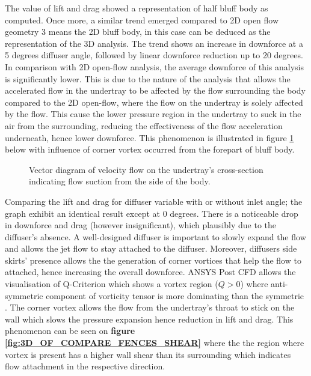 \noindent The value of lift and drag showed a representation of half bluff body as computed. Once more, a similar trend emerged compared to 2D open flow geometry 3 means the 2D bluff body, in this case can be deduced as the representation of the 3D analysis.  The trend shows an increase in downforce at a 5 degrees diffuser angle, followed by linear downforce reduction up to 20 degrees.  In comparison with 2D open-flow analysis, the average downforce of this analysis is significantly lower. This is due to the nature of the analysis that allows the accelerated flow in the undertray to be affected by the flow surrounding the body compared to the 2D open-flow, where the flow on the undertray is solely affected by the flow. This cause the lower pressure region in the undertray to suck in the air from the surrounding,  reducing the effectiveness of the flow acceleration underneath, hence lower downforce. This phenomenon is illustrated in figure \ref{fig:Vector_suction_diagram} below with influence of corner vortex occurred from the forepart of bluff body. 

\begin{figure}[!htb]
    \centering
    \noindent{}
    \caption{Vector diagram of velocity flow on the undertray's cross-section indicating flow suction from the side of the body.}
    \label{fig:Vector_suction_diagram}
\end{figure}

\noindent Comparing the lift and drag for diffuser variable with or without inlet angle; the graph exhibit an identical result except at 0 degrees.  There is a noticeable drop in downforce and drag (however insignificant), which plausibly due to the diffuser's absence. A well-designed diffuser is important to slowly expand the flow and allows the jet flow to stay attached to the diffuser. Moreover, diffusers side skirts' presence allows the the generation of corner vortices that help the flow to attached, hence increasing the overall downforce.  ANSYS Post CFD allows the visualisation of Q-Criterion which shows a vortex region ($Q > 0$) where anti-symmetric component of vorticity tensor is more dominating than the symmetric \cite{Holmen2012MethodsIdentification}. The corner vortex allows the flow from the undertray's throat to stick on the wall which slows the pressure expansion hence reduction in lift and drag. This phenomenon can be seen on \textbf{figure \ref{fig:3D_OF_COMPARE_FENCES_SHEAR}} where the the region where vortex is present has a higher wall shear than its surrounding which indicates flow attachment in the respective direction. 


